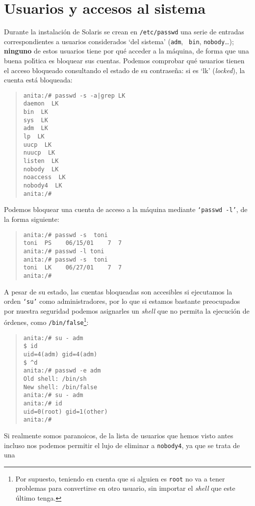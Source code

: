 \section{Usuarios y accesos al sistema}
Durante la instalaci\'on de Solaris se crean en {\tt /etc/passwd} una serie de
entradas correspondientes a usuarios considerados `del sistema' ({\tt adm}, {\tt
bin}, {\tt nobody}\ldots); {\bf ninguno} de estos usuarios tiene por qu\'e 
acceder a la m\'aquina, de forma que una buena pol\'{\i}tica es bloquear sus 
cuentas. Podemos comprobar qu\'e usuarios tienen el acceso bloqueado consultando
el estado de su contrase\~na: si es {\sc `lk'} ({\it locked}), la cuenta est\'a
bloqueada:
\begin{quote}
\begin{verbatim}
anita:/# passwd -s -a|grep LK
daemon  LK    
bin  LK    
sys  LK    
adm  LK    
lp  LK    
uucp  LK    
nuucp  LK    
listen  LK    
nobody  LK    
noaccess  LK    
nobody4  LK    
anita:/# 
\end{verbatim}
\end{quote}
Podemos bloquear una cuenta de acceso a la m\'aquina mediante {\tt `passwd -l'},
de la forma siguiente:
\begin{quote}
\begin{verbatim}
anita:/# passwd -s  toni
toni  PS    06/15/01    7  7  
anita:/# passwd -l toni
anita:/# passwd -s  toni
toni  LK    06/27/01    7  7  
anita:/# 
\end{verbatim}
\end{quote}
A pesar de su estado, las cuentas bloqueadas son accesibles si ejecutamos la
orden {\tt `su'} como ad\-mi\-nis\-tra\-do\-res, por lo que si estamos bastante 
preocupados por
nuestra seguridad podemos asignarles un {\it shell} que no permita la 
ejecuci\'on de \'ordenes, como {\tt /bin/false}\footnote{Por supuesto, teniendo 
en cuenta que si alguien es {\tt root} no va a tener problemas para convertirse
en otro usuario, sin importar el {\it shell} que este \'ultimo tenga.}:
\begin{quote}
\begin{verbatim}
anita:/# su - adm
$ id
uid=4(adm) gid=4(adm)
$ ^d
anita:/# passwd -e adm
Old shell: /bin/sh
New shell: /bin/false
anita:/# su - adm
anita:/# id
uid=0(root) gid=1(other)
anita:/# 
\end{verbatim}
\end{quote}
Si realmente somos paranoicos, de la lista de usuarios que hemos visto antes 
incluso nos 
podemos permitir el lujo de eliminar a {\tt nobody4}, ya que se trata de una 
